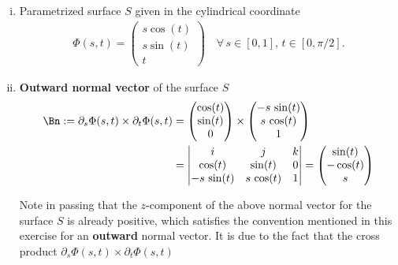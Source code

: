 \documentclass[12pt]{article}
\begin{document}
\begin{enumerate}[(i)]
	\item Parametrized surface $S$ given in the cylindrical coordinate
	      \begin{align}
		      \Phi(s,t) = 
		      \begin{pmatrix}
			      s \cos(t) \\ s \sin(t) \\ t
		      \end{pmatrix}
		      \quad 
		      \forall \, s\in [0,1], \, t\in[0,\pi/2].
	      \end{align}
	      
	\item \textbf{Outward normal vector} of the surface $S$
	      \begin{align}
		      \label{eq:normalvector}
		      \Bn:=
		      \partial_{s}\Phi(s,t) \times \partial_{t}\Phi(s,t)
		       & =
		      \begin{pmatrix}
			      \cos(t) \\ \sin(t) \\ 0
		      \end{pmatrix}
		      \times
		      \begin{pmatrix}
			      -s\,\sin(t) \\ s\,\cos(t) \\ 1
		      \end{pmatrix} \notag \\
		       & =
		      \begin{vmatrix}
			      i           & j          & k \\
			      \cos(t)     & \sin(t)    & 0 \\
			      -s\,\sin(t) & s\,\cos(t) & 1
		      \end{vmatrix}
		      =
		      \begin{pmatrix}
			      \sin(t) \\ -\cos(t) \\  s
		      \end{pmatrix}
	      \end{align}
	      \begin{observationboxed}
		      Note in passing that the $z$-component of the above normal vector 
		      for the surface $S$ is already positive, which satisfies 
		      the convention mentioned in this exercise
		      for an \textbf{outward} normal vector.
		      It is due to the fact that the cross product
		      $\partial_{s}\Phi(s,t) \times \partial_{t}\Phi(s,t)$

\end{observationboxed}
\end{enumerate}
\end{document}
